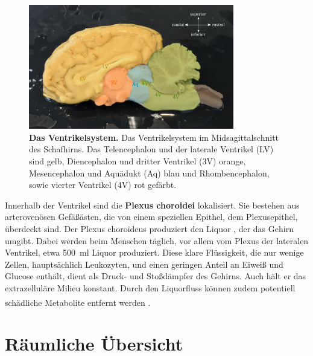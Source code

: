 \documentclass[12pt,a4paper,pdftex]{article}
\begin{document}
\begin{figure}[H]
	\centering
	\includegraphics[width=0.8\textwidth]{pictures/Bilder_Jule/Andere/ventrikelsystem.png}
	\caption[Das Ventrikelsystem]{\textbf{Das Ventrikelsystem.} Das Ventrikelsystem im Midsagittalschnitt des Schafhirns. Das Telencephalon und der laterale Ventrikel (LV) sind gelb, Diencephalon und dritter Ventrikel (3V) orange, Mesencephalon und Aquädukt (Aq) blau und Rhombencephalon, sowie vierter Ventrikel (4V) rot gefärbt.}
	\label{fig:ventrikelsystem}
\end{figure}

\noindent Innerhalb der Ventrikel sind die \textbf{Plexus choroidei}  lokalisiert. Sie bestehen aus arterovenösen Gefäßästen, die von einem speziellen Epithel, dem Plexusepithel, überdeckt sind. Der Plexus choroideus produziert den Liquor , der das Gehirn umgibt. Dabei werden beim Menschen täglich, vor allem vom Plexus der lateralen Ventrikel, etwa 500~ml Liquor produziert. Diese klare Flüssigkeit, die nur wenige Zellen, hauptsächlich Leukozyten, und einen geringen Anteil an Eiweiß und Glucose enthält, dient als Druck- und Stoßdämpfer des Gehirns. Auch hält er das extrazelluläre Milieu konstant. Durch den Liquorfluss können zudem potentiell schädliche Metabolite entfernt werden \textsuperscript{\cite[10]{trepel2011neuroanatomie}}. 

\newpage
\section{Räumliche Übersicht}
\label{sec:raeumliche_uebersicht}
\end{document}

